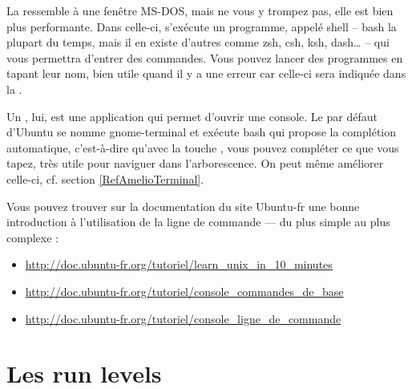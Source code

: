 La  ressemble à une fenêtre MS-DOS, mais ne vous y trompez pas, elle est bien plus performante. Dans celle-ci, s'exécute un programme, appelé shell -- bash la plupart du temps, mais il en existe d'autres comme zsh, csh, ksh, dash… -- qui vous permettra d'entrer des commandes. Vous pouvez lancer des programmes en tapant leur nom, bien utile quand il y a une erreur car celle-ci sera indiquée dans la .\par
Un , lui, est une application qui permet d'ouvrir une console. Le  par défaut d'Ubuntu se nomme gnome-terminal et exécute bash qui propose la complétion automatique, c'est-à-dire qu'avec la touche , vous pouvez compléter ce que vous tapez, très utile pour naviguer dans l'arborescence. On peut même améliorer celle-ci, cf. section \ref{RefAmelioTerminal}.\par
Vous pouvez trouver sur la documentation du site Ubuntu-fr une bonne introduction à l'utilisation de la ligne de commande --- du plus simple au plus complexe :
\begin{itemize}
\item \url{http://doc.ubuntu-fr.org/tutoriel/learn_unix_in_10_minutes}
\item \url{http://doc.ubuntu-fr.org/tutoriel/console_commandes_de_base}
\item \url{http://doc.ubuntu-fr.org/tutoriel/console_ligne_de_commande}
\end{itemize}
\section{Les run levels}

